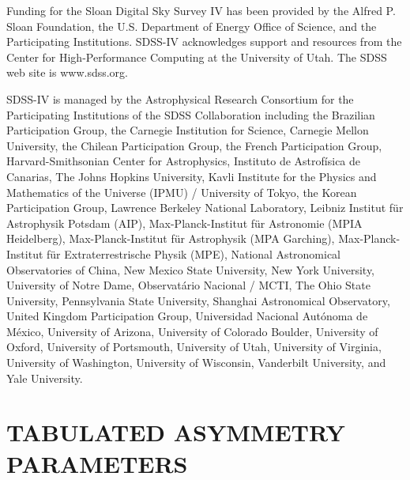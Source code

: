 \documentclass[fleqn,usenatbib]{mnras}
\begin{document}
Funding for the Sloan Digital Sky Survey IV has been provided by the Alfred P. Sloan Foundation, the U.S. Department of Energy Office of Science, and the Participating Institutions. SDSS-IV acknowledges support and resources from the Center for High-Performance Computing at the University of Utah. The SDSS web site is www.sdss.org.

SDSS-IV is managed by the Astrophysical Research Consortium for the Participating Institutions of the SDSS Collaboration including the Brazilian Participation Group, the Carnegie Institution for Science, Carnegie Mellon University, the Chilean Participation Group, the French Participation Group, Harvard-Smithsonian Center for Astrophysics, Instituto de Astrof\'isica de Canarias, The Johns Hopkins University, Kavli Institute for the Physics and Mathematics of the Universe (IPMU) / University of Tokyo, the Korean Participation Group, Lawrence Berkeley National Laboratory, Leibniz Institut f\"ur Astrophysik Potsdam (AIP), Max-Planck-Institut f\"ur Astronomie (MPIA Heidelberg), Max-Planck-Institut f\"ur Astrophysik (MPA Garching), Max-Planck-Institut f\"ur Extraterrestrische Physik (MPE), National Astronomical Observatories of China, New Mexico State University, New York University, University of Notre Dame, Observat\'ario Nacional / MCTI, The Ohio State University, Pennsylvania State University, Shanghai Astronomical Observatory, United Kingdom Participation Group, Universidad Nacional Aut\'onoma de M\'exico, University of Arizona, University of Colorado Boulder, University of Oxford, University of Portsmouth, University of Utah, University of Virginia, University of Washington, University of Wisconsin, 
Vanderbilt University, and Yale University.









\appendix

\section{TABULATED ASYMMETRY PARAMETERS}
\label{appendix:tabulated_params}
\end{document}
